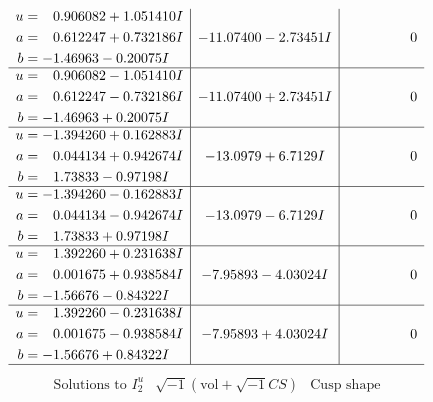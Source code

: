 \documentclass[1p]{elsarticle_modified}
\theoremstyle{definition}
\newcommand{\I}{\sqrt{-1}}
\begin{document}
$$\begin{array}{c|c|c}
\begin{aligned}
u &= \phantom{-}0.906082 + 1.051410 I \\
a &= \phantom{-}0.612247 + 0.732186 I \\
b &= -1.46963 - 0.20075 I\end{aligned}
 & -11.07400 - 2.73451 I & \phantom{-0.000000 } 0 \\ \hline\begin{aligned}
u &= \phantom{-}0.906082 - 1.051410 I \\
a &= \phantom{-}0.612247 - 0.732186 I \\
b &= -1.46963 + 0.20075 I\end{aligned}
 & -11.07400 + 2.73451 I & \phantom{-0.000000 } 0 \\ \hline\begin{aligned}
u &= -1.394260 + 0.162883 I \\
a &= \phantom{-}0.044134 + 0.942674 I \\
b &= \phantom{-}1.73833 - 0.97198 I\end{aligned}
 & -13.0979 + 6.7129 I & \phantom{-0.000000 } 0 \\ \hline\begin{aligned}
u &= -1.394260 - 0.162883 I \\
a &= \phantom{-}0.044134 - 0.942674 I \\
b &= \phantom{-}1.73833 + 0.97198 I\end{aligned}
 & -13.0979 - 6.7129 I & \phantom{-0.000000 } 0 \\ \hline\begin{aligned}
u &= \phantom{-}1.392260 + 0.231638 I \\
a &= \phantom{-}0.001675 + 0.938584 I \\
b &= -1.56676 - 0.84322 I\end{aligned}
 & -7.95893 - 4.03024 I & \phantom{-0.000000 } 0 \\ \hline\begin{aligned}
u &= \phantom{-}1.392260 - 0.231638 I \\
a &= \phantom{-}0.001675 - 0.938584 I \\
b &= -1.56676 + 0.84322 I\end{aligned}
 & -7.95893 + 4.03024 I & \phantom{-0.000000 } 0\\
 \hline 
 \end{array}$$\newpage$$\begin{array}{c|c|c}  
\text{Solutions to }I^u_{2}& \I (\text{vol} + \sqrt{-1}CS) & \text{Cusp shape}\\
 \hline 
\begin{aligned}

\end{aligned}
\end{array}$$
\end{document}
